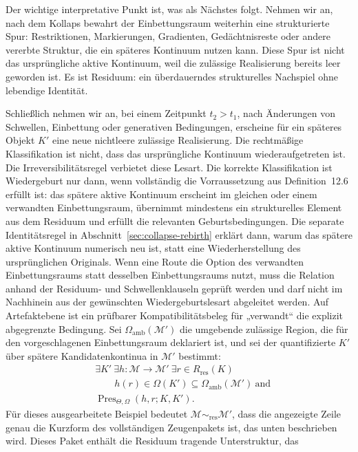 Der wichtige interpretative Punkt ist, was als Nächstes folgt. Nehmen wir an, nach dem Kollaps bewahrt der Einbettungsraum weiterhin
eine strukturierte Spur: Restriktionen, Markierungen, Gradienten, Gedächtnisreste oder andere vererbte Struktur,
die ein späteres Kontinuum nutzen kann. Diese Spur ist nicht das ursprüngliche aktive Kontinuum, weil die
zulässige Realisierung bereits leer geworden ist. Es ist Residuum: ein überdauerndes strukturelles Nachspiel
ohne lebendige Identität.

Schließlich nehmen wir an, bei einem Zeitpunkt \(t_2>t_1\), nach Änderungen von Schwellen, Einbettung oder
generativen Bedingungen, erscheine für ein späteres Objekt \(K'\) eine neue nichtleere zulässige Realisierung.
Die rechtmäßige Klassifikation ist nicht, dass das ursprüngliche Kontinuum wiederaufgetreten ist. Die
Irreversibilitätsregel verbietet diese Lesart. Die korrekte Klassifikation ist Wiedergeburt nur dann, wenn
vollständig die Vorraussetzung aus Definition~12.6 erfüllt ist: das spätere aktive Kontinuum erscheint im
gleichen oder einem verwandten Einbettungsraum, übernimmt mindestens ein strukturelles Element aus dem
Residuum und erfüllt die relevanten Geburtsbedingungen. Die separate Identitätsregel in
Abschnitt~\ref{sec:collapse-rebirth} erklärt dann, warum das spätere aktive Kontinuum numerisch neu ist,
statt eine Wiederherstellung des ursprünglichen Originals.
Wenn eine Route die Option des verwandten Einbettungsraums statt desselben Einbettungsraums nutzt, muss die
Relation anhand der Residuum- und Schwellenklauseln geprüft werden und darf nicht im Nachhinein aus der
gewünschten Wiedergeburtslesart abgeleitet werden. Auf Artefaktebene ist ein prüfbarer Kompatibilitätsbeleg
für „verwandt“ die explizit abgegrenzte Bedingung. Sei \(\Omega_{\mathrm{amb}}(\mathcal{M}')\) die
umgebende zulässige Region, die für den vorgeschlagenen Einbettungsraum deklariert ist, und sei der
quantifizierte \(K'\) über spätere Kandidatenkontinua in \(\mathcal{M}'\) bestimmt:
\[
  \begin{aligned}
  &\exists K'\ \exists h:\mathcal{M}\to\mathcal{M}'\ \exists r\in R_{\mathrm{res}}(K)\\
  &\qquad h(r)\in\Omega(K')\subseteq\Omega_{\mathrm{amb}}(\mathcal{M}')\ \text{and}\\
  &\operatorname{Pres}_{\Theta,\Omega}(h,r;K,K').
  \end{aligned}
\]
Für dieses ausgearbeitete Beispiel bedeutet
\(\mathcal{M}\sim_{\mathrm{res}}\mathcal{M}'\), dass die angezeigte Zeile genau die Kurzform des vollständigen
Zeugenpakets ist, das unten beschrieben wird. Dieses Paket enthält die Residuum tragende Unterstruktur, das
